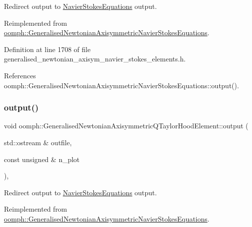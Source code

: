 Redirect output to \hyperlink{classoomph_1_1NavierStokesEquations}{Navier\+Stokes\+Equations} output. 



Reimplemented from \hyperlink{classoomph_1_1GeneralisedNewtonianAxisymmetricNavierStokesEquations_a25e906f89c3cec75081bd2fc88b37fd5}{oomph\+::\+Generalised\+Newtonian\+Axisymmetric\+Navier\+Stokes\+Equations}.



Definition at line 1708 of file generalised\+\_\+newtonian\+\_\+axisym\+\_\+navier\+\_\+stokes\+\_\+elements.\+h.



References oomph\+::\+Generalised\+Newtonian\+Axisymmetric\+Navier\+Stokes\+Equations\+::output().

\mbox{\label{classoomph_1_1GeneralisedNewtonianAxisymmetricQTaylorHoodElement_a523d450f7d50883425f33c9858ae6452}} 
\subsubsection{\texorpdfstring{output()}{output()}\hspace{0.1cm}{\footnotesize\ttfamily [2/4]}}
{\footnotesize\ttfamily void oomph\+::\+Generalised\+Newtonian\+Axisymmetric\+Q\+Taylor\+Hood\+Element\+::output (\begin{DoxyParamCaption}\item[{std\+::ostream \&}]{outfile,  }\item[{const unsigned \&}]{n\+\_\+plot }\end{DoxyParamCaption})\hspace{0.3cm}{\ttfamily [inline]}, {\ttfamily [virtual]}}



Redirect output to \hyperlink{classoomph_1_1NavierStokesEquations}{Navier\+Stokes\+Equations} output. 



Reimplemented from \hyperlink{classoomph_1_1GeneralisedNewtonianAxisymmetricNavierStokesEquations_a7c80af0c22f64c3484cdeac1edcbe28c}{oomph\+::\+Generalised\+Newtonian\+Axisymmetric\+Navier\+Stokes\+Equations}.




